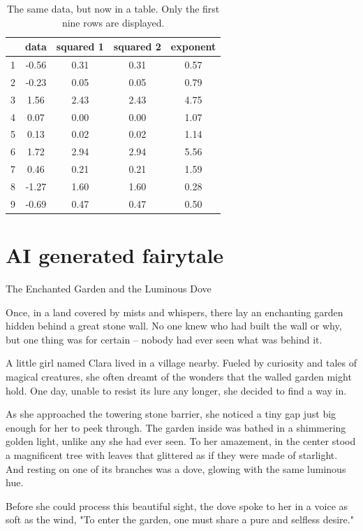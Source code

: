 \documentclass[10pt, fullpage, a4paper, titlepage]{article}
\begin{document}
 \begin{table}[h]
\centering
\caption{The same data, but now in a table. Only the first nine rows are displayed.}
\label{tab:my-table}
\begin{tabular}{@{}ccccc@{}}
\toprule
  & data  & squared 1 & squared 2 & exponent \\ \midrule
1 & -0.56 & 0.31      & 0.31      & 0.57     \\
2 & -0.23 & 0.05      & 0.05      & 0.79     \\
3 & 1.56  & 2.43      & 2.43      & 4.75     \\
4 & 0.07  & 0.00      & 0.00      & 1.07     \\ 
5 & 0.13  & 0.02      & 0.02      & 1.14     \\
6 & 1.72  & 2.94      & 2.94      & 5.56     \\
7 & 0.46  & 0.21      & 0.21      & 1.59     \\
8 & -1.27 & 1.60      & 1.60      & 0.28     \\
9 & -0.69 & 0.47      & 0.47      & 0.50    
\end{tabular}
\end{table}

\newpage
\section{AI generated fairytale}
The Enchanted Garden and the Luminous Dove

Once, in a land covered by mists and whispers, there lay an enchanting garden hidden behind a great stone wall. No one knew who had built the wall or why, but one thing was for certain – nobody had ever seen what was behind it.

A little girl named Clara lived in a village nearby. Fueled by curiosity and tales of magical creatures, she often dreamt of the wonders that the walled garden might hold. One day, unable to resist its lure any longer, she decided to find a way in.

As she approached the towering stone barrier, she noticed a tiny gap just big enough for her to peek through. The garden inside was bathed in a shimmering golden light, unlike any she had ever seen. To her amazement, in the center stood a magnificent tree with leaves that glittered as if they were made of starlight. And resting on one of its branches was a dove, glowing with the same luminous hue.

Before she could process this beautiful sight, the dove spoke to her in a voice as soft as the wind, "To enter the garden, one must share a pure and selfless desire."
\end{document}
